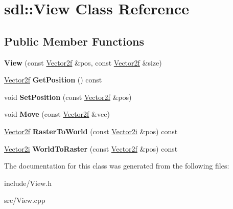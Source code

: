 \hypertarget{classsdl_1_1View}{\section{sdl\-:\-:View Class Reference}
\label{classsdl_1_1View}
}
\subsection*{Public Member Functions}
\begin{DoxyCompactItemize}
\item 
\hypertarget{classsdl_1_1View_a65409de0761dc4c3afa4098f587812a6}{{\bfseries View} (const \hyperlink{classsdl_1_1Vector2f}{Vector2f} \&pos, const \hyperlink{classsdl_1_1Vector2f}{Vector2f} \&size)}\label{classsdl_1_1View_a65409de0761dc4c3afa4098f587812a6}

\item 
\hypertarget{classsdl_1_1View_a292bdec8f5da4a4ceb78a43c6de2e482}{\hyperlink{classsdl_1_1Vector2f}{Vector2f} {\bfseries Get\-Position} () const }\label{classsdl_1_1View_a292bdec8f5da4a4ceb78a43c6de2e482}

\item 
\hypertarget{classsdl_1_1View_aa84b47ca6ca27bdea7c148be54c9dc01}{void {\bfseries Set\-Position} (const \hyperlink{classsdl_1_1Vector2f}{Vector2f} \&pos)}\label{classsdl_1_1View_aa84b47ca6ca27bdea7c148be54c9dc01}

\item 
\hypertarget{classsdl_1_1View_ab0ff71bba39b833207cd775f7c87a7b7}{void {\bfseries Move} (const \hyperlink{classsdl_1_1Vector2f}{Vector2f} \&vec)}\label{classsdl_1_1View_ab0ff71bba39b833207cd775f7c87a7b7}

\item 
\hypertarget{classsdl_1_1View_a5cb51d8ad6215d592d3c4bf78e2dc3d0}{\hyperlink{classsdl_1_1Vector2f}{Vector2f} {\bfseries Raster\-To\-World} (const \hyperlink{classsdl_1_1Vector2}{Vector2i} \&pos) const }\label{classsdl_1_1View_a5cb51d8ad6215d592d3c4bf78e2dc3d0}

\item 
\hypertarget{classsdl_1_1View_a89feab9b8b309cd4fbeddcc11623dadf}{\hyperlink{classsdl_1_1Vector2}{Vector2i} {\bfseries World\-To\-Raster} (const \hyperlink{classsdl_1_1Vector2f}{Vector2f} \&pos) const }\label{classsdl_1_1View_a89feab9b8b309cd4fbeddcc11623dadf}

\end{DoxyCompactItemize}


The documentation for this class was generated from the following files\-:\begin{DoxyCompactItemize}
\item 
include/View.\-h\item 
src/View.\-cpp\end{DoxyCompactItemize}
